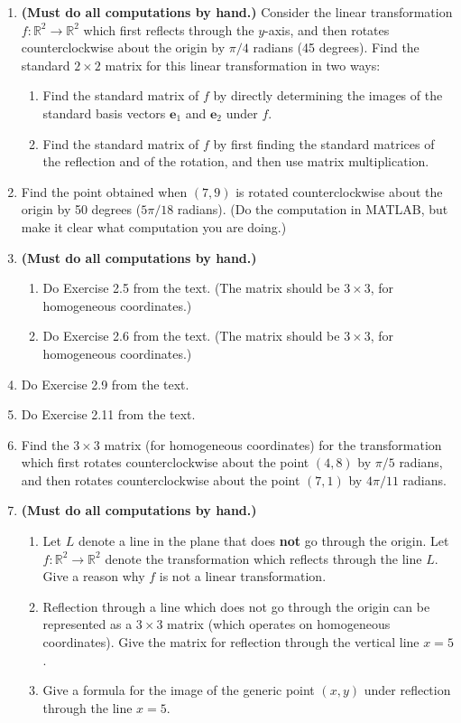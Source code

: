 \documentclass{article}
\newcommand{\R}{\mathbb{R}}
\begin{document}
\begin{enumerate}
	\item \textbf{(Must do all computations by hand.)} Consider the linear transformation $f: \R^2 \to \R^2$ which first reflects through the $y$-axis, and then rotates counterclockwise about the origin by $\pi/4$ radians (45 degrees).  Find the standard $2 \times 2$ matrix for this linear transformation in two ways:
	\begin{enumerate}
		\item Find the standard matrix of $f$ by directly determining the images of the standard basis vectors $\mathbf{e}_1$ and $\mathbf{e}_2$ under $f$.
		\item Find the standard matrix of $f$ by first finding the standard matrices of the reflection and of the rotation, and then use matrix multiplication.
	\end{enumerate}

	\item Find the point obtained when $(7, 9)$ is rotated counterclockwise about the origin by 50 degrees ($5\pi/18$ radians).  (Do the computation in MATLAB, but make it clear what computation you are doing.)
	
	\item \textbf{(Must do all computations by hand.)} \begin{enumerate}
		\item Do Exercise 2.5 from the text.  (The matrix should be $3 \times 3$, for homogeneous coordinates.)
		\item Do Exercise 2.6 from the text.  (The matrix should be $3 \times 3$, for homogeneous coordinates.)
	\end{enumerate}
	
	\item Do Exercise 2.9 from the text.
	
	\item Do Exercise 2.11 from the text.
	
	\item Find the $3 \times 3$ matrix (for homogeneous coordinates) for the transformation which first rotates counterclockwise about the point $(4, 8)$ by $\pi/5$ radians, and then rotates counterclockwise about the point $(7,1)$ by $4\pi/11$ radians.
	
	\item \textbf{(Must do all computations by hand.)}
	\begin{enumerate}
		\item Let $L$ denote a line in the plane that does \textbf{not} go through the origin.  Let $f: \R^2 \to \R^2$ denote the transformation which reflects through the line $L$.  Give a reason why $f$ is not a linear transformation.
		\item Reflection through a line which does not go through the origin can be represented as a $3 \times 3$ matrix (which operates on homogeneous coordinates).  Give the matrix for reflection through the vertical line $x=5$.
		\item Give a formula for the image of the generic point $(x,y)$ under reflection through the line $x=5$.
	\end{enumerate}


\end{enumerate}
\end{document}
